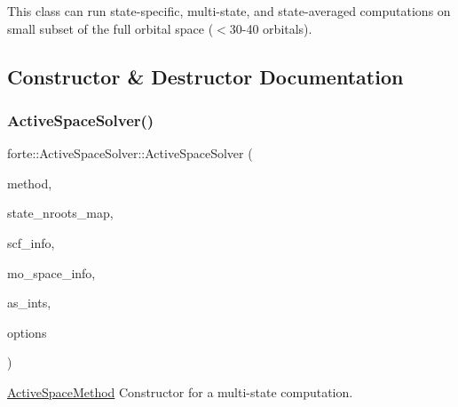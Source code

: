 This class can run state-\/specific, multi-\/state, and state-\/averaged computations on small subset of the full orbital space ($<$30-\/40 orbitals). 

\subsection{Constructor \& Destructor Documentation}
\mbox{\label{classforte_1_1_active_space_solver_af2b538aa99fd5b6493d0825f9c0a3729}} 
\subsubsection{\texorpdfstring{Active\+Space\+Solver()}{ActiveSpaceSolver()}}
{\footnotesize\ttfamily forte\+::\+Active\+Space\+Solver\+::\+Active\+Space\+Solver (\begin{DoxyParamCaption}\item[{const std\+::string \&}]{method,  }\item[{const std\+::map$<$ \mbox{\hyperlink{classforte_1_1_state_info}{State\+Info}}, size\+\_\+t $>$ \&}]{state\+\_\+nroots\+\_\+map,  }\item[{std\+::shared\+\_\+ptr$<$ \mbox{\hyperlink{classforte_1_1_s_c_f_info}{S\+C\+F\+Info}} $>$}]{scf\+\_\+info,  }\item[{std\+::shared\+\_\+ptr$<$ \mbox{\hyperlink{classforte_1_1_m_o_space_info}{M\+O\+Space\+Info}} $>$}]{mo\+\_\+space\+\_\+info,  }\item[{std\+::shared\+\_\+ptr$<$ \mbox{\hyperlink{classforte_1_1_active_space_integrals}{Active\+Space\+Integrals}} $>$}]{as\+\_\+ints,  }\item[{std\+::shared\+\_\+ptr$<$ \mbox{\hyperlink{classforte_1_1_forte_options}{Forte\+Options}} $>$}]{options }\end{DoxyParamCaption})}



\mbox{\hyperlink{classforte_1_1_active_space_method}{Active\+Space\+Method}} Constructor for a multi-\/state computation. 


